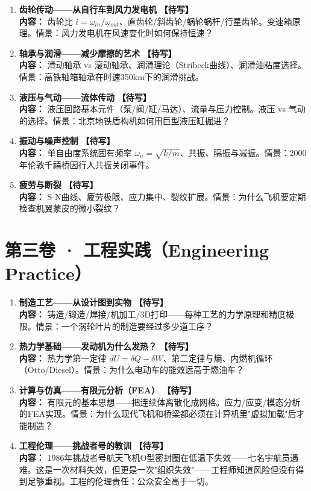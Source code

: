 \documentclass[a4paper,11pt]{ctexart}
\newcommand{\draft}{\textcolor{orange!80!black}{\textbf{【待写】}}}
\begin{document}
\begin{enumerate}
\item[\textbf{第7课}] \textbf{齿轮传动——从自行车到风力发电机} \draft \\
\textbf{内容：} 齿轮比 $i=\omega_{in}/\omega_{out}$、直齿轮/斜齿轮/蜗轮蜗杆/行星齿轮。变速箱原理。情景：风力发电机在风速变化时如何保持恒速？
\item[\textbf{第8课}] \textbf{轴承与润滑——减少摩擦的艺术} \draft \\
\textbf{内容：} 滑动轴承 vs 滚动轴承、润滑理论（Stribeck曲线）、润滑油粘度选择。情景：高铁轴箱轴承在时速350km下的润滑挑战。
\item[\textbf{第9课}] \textbf{液压与气动——流体传动} \draft \\
\textbf{内容：} 液压回路基本元件（泵/阀/缸/马达）、流量与压力控制。液压 vs 气动的选择。情景：北京地铁盾构机如何用巨型液压缸掘进？
\item[\textbf{第10课}] \textbf{振动与噪声控制} \draft \\
\textbf{内容：} 单自由度系统固有频率 $\omega_n=\sqrt{k/m}$、共振、隔振与减振。情景：2000年伦敦千禧桥因行人共振关闭事件。
\item[\textbf{第11课}] \textbf{疲劳与断裂} \draft \\
\textbf{内容：} S-N曲线、疲劳极限、应力集中、裂纹扩展。情景：为什么飞机要定期检查机翼蒙皮的微小裂纹？
\end{enumerate}

\section*{第三卷 · 工程实践（Engineering Practice）}

\begin{enumerate}
\item[\textbf{第12课}] \textbf{制造工艺——从设计图到实物} \draft \\
\textbf{内容：} 铸造/锻造/焊接/机加工/3D打印——每种工艺的力学原理和精度极限。情景：一个涡轮叶片的制造要经过多少道工序？
\item[\textbf{第13课}] \textbf{热力学基础——发动机为什么发热？} \draft \\
\textbf{内容：} 热力学第一定律 $dU = \delta Q - \delta W$、第二定律与熵、内燃机循环（Otto/Diesel）。情景：为什么电动车的能效远高于燃油车？
\item[\textbf{第14课}] \textbf{计算与仿真——有限元分析（FEA）} \draft \\
\textbf{内容：} 有限元的基本思想——把连续体离散化成网格。应力/应变/模态分析的FEA实现。情景：为什么现代飞机和桥梁都必须在计算机里"虚拟加载"后才能制造？
\item[\textbf{第15课}] \textbf{工程伦理——挑战者号的教训} \draft \\
\textbf{内容：} 1986年挑战者号航天飞机O型密封圈在低温下失效——七名宇航员遇难。这是一次材料失效，但更是一次"组织失效"——工程师知道风险但没有得到足够重视。工程的伦理责任：公众安全高于一切。
\end{enumerate}
\end{document}
